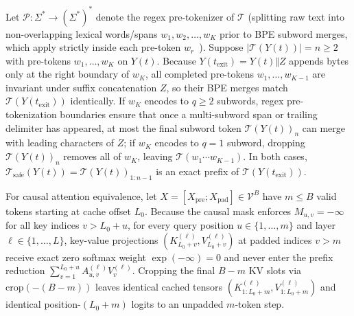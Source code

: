 \documentclass[10pt,journal,compsoc]{IEEEtran}
\theoremstyle{definition}
\theoremstyle{remark}
\begin{document}
\begin{IEEEproof}
Let $\mathcal{P}: \Sigma^* \to (\Sigma^*)^*$ denote the regex pre-tokenizer of $\mathcal{T}$ (splitting raw text into non-overlapping lexical words/spans $w_1, w_2, \dots, w_K$ prior to BPE subword merges, which apply strictly inside each pre-token $w_r$~\cite{sennrich2016bpe}). Suppose $|\mathcal{T}(Y(t))| = n \ge 2$ with pre-tokens $w_1, \dots, w_K$ on $Y(t)$. Because $Y(t_{\mathrm{exit}}) = Y(t) \Vert Z$ appends bytes only at the right boundary of $w_K$, all completed pre-tokens $w_1, \dots, w_{K-1}$ are invariant under suffix concatenation $Z$, so their BPE merges match $\mathcal{T}(Y(t_{\mathrm{exit}}))$ identically. If $w_K$ encodes to $q \ge 2$ subwords, regex pre-tokenization boundaries ensure that once a multi-subword span or trailing delimiter has appeared, at most the final subword token $\mathcal{T}(Y(t))_n$ can merge with leading characters of $Z$; if $w_K$ encodes to $q = 1$ subword, dropping $\mathcal{T}(Y(t))_n$ removes all of $w_K$, leaving $\mathcal{T}(w_1 \cdots w_{K-1})$. In both cases, $\mathcal{T}_{\mathrm{safe}}(Y(t)) = \mathcal{T}(Y(t))_{1:n-1}$ is an exact prefix of $\mathcal{T}(Y(t_{\mathrm{exit}}))$.

For causal attention equivalence, let $X = [X_{\mathrm{pre}}; X_{\mathrm{pad}}] \in \mathcal{V}^B$ have $m \le B$ valid tokens starting at cache offset $L_0$. Because the causal mask enforces $M_{u,v} = -\infty$ for all key indices $v > L_0 + u$, for every query position $u \in \{1,\dots,m\}$ and layer $\ell \in \{1,\dots,L\}$, key-value projections $(K_{L_0+v}^{(\ell)}, V_{L_0+v}^{(\ell)})$ at padded indices $v > m$ receive exact zero softmax weight $\exp(-\infty) = 0$ and never enter the prefix reduction $\sum_{v=1}^{L_0+u} A_{u,v}^{(\ell)} V_v^{(\ell)}$. Cropping the final $B - m$ KV slots via $\mathrm{crop}(-(B - m))$ leaves identical cached tensors $(K_{1:L_0+m}^{(\ell)}, V_{1:L_0+m}^{(\ell)})$ and identical position-$(L_0+m)$ logits to an unpadded $m$-token step.
\end{IEEEproof}
\end{document}
